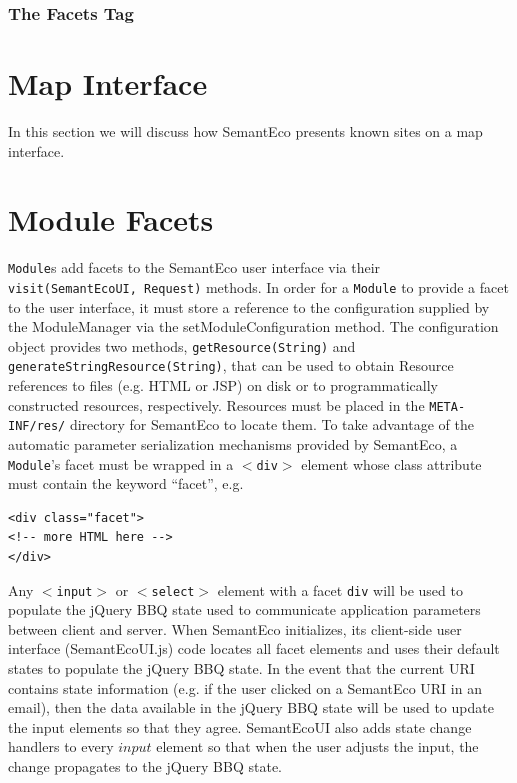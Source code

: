 \documentclass[letterpaper]{report}
\begin{document}
\subsubsection{The Facets Tag}

\section{Map Interface}
\label{maps}
In this section we will discuss how SemantEco presents known sites on a map interface.

\section{Module Facets}
\label{facets}
\texttt{Module}s add facets to the SemantEco user interface via their \texttt{visit(SemantEcoUI, Request)} methods. In order for a \texttt{Module} to provide a facet to the user interface, it must store a reference to the configuration supplied by the ModuleManager via the setModuleConfiguration method. The configuration object provides two methods, \texttt{getResource(String)} and \texttt{generateStringResource(String)}, that can be used to obtain Resource references to files (e.g. HTML or JSP) on disk or to programmatically constructed resources, respectively. Resources must be placed in the \texttt{META-INF/res/} directory for SemantEco to locate them. To take advantage of the automatic parameter serialization mechanisms provided by SemantEco, a \texttt{Module}'s facet must be wrapped in a \texttt{$<$div$>$} element whose class attribute must contain the keyword ``facet'', e.g.

\begin{verbatim}
<div class="facet">
<!-- more HTML here -->
</div>
\end{verbatim}

Any \texttt{$<$input$>$} or \texttt{$<$select$>$} element with a facet \texttt{div} will be used to populate the jQuery BBQ state used to communicate application parameters between client and server. When SemantEco initializes, its client-side user interface (SemantEcoUI.js) code locates all facet elements and uses their default states to populate the jQuery BBQ state. In the event that the current URI contains state information (e.g. if the user clicked on a SemantEco URI in an email), then the data available in the jQuery BBQ state will be used to update the input elements so that they agree. SemantEcoUI also adds state change handlers to every $input$ element so that when the user adjusts the input, the change propagates to the jQuery BBQ state.
\end{document}
